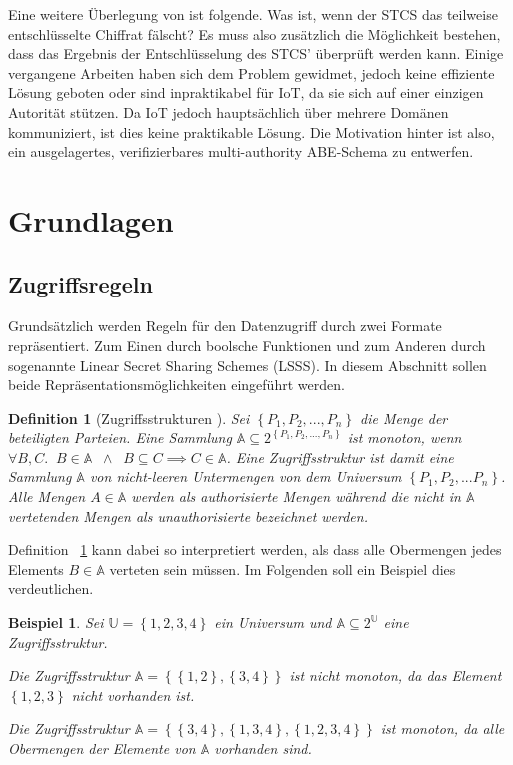 \documentclass{hsflensburg}
\newtheorem{definition}{Definition}
\newtheorem*{example}{Beispiel}
\begin{document}
	Eine weitere Überlegung von \cite{phoabe} ist folgende. Was ist, wenn der STCS
	das teilweise entschlüsselte Chiffrat fälscht? Es muss also zusätzlich die
	Möglichkeit bestehen, dass das Ergebnis der Entschlüsselung des STCS'
	überprüft werden kann. Einige vergangene Arbeiten haben sich dem Problem
	gewidmet, jedoch keine effiziente Lösung geboten oder sind inpraktikabel für
	IoT, da sie sich auf einer einzigen Autorität stützen. Da IoT jedoch
	hauptsächlich über mehrere Domänen kommuniziert, ist dies keine praktikable
	Lösung. Die Motivation hinter \cite{phoabe} ist also, ein ausgelagertes,
	verifizierbares multi-authority ABE-Schema zu entwerfen.
	
	\section{Grundlagen}
	\subsection{Zugriffsregeln}
	Grundsätzlich werden Regeln für den Datenzugriff durch zwei Formate
	repräsentiert. Zum Einen durch boolsche Funktionen und zum Anderen durch
	sogenannte Linear Secret Sharing Schemes (LSSS). In diesem Abschnitt sollen
	beide Repräsentationsmöglichkeiten eingeführt werden.

	\begin{definition}[Zugriffsstrukturen \cite{abe}]\label{def:access-structures}
		Sei $\left\{ P_1, P_2, ..., P_n \right\}$ die Menge der beteiligten
		Parteien. Eine Sammlung $\mathbb{A} \subseteq 2^{\left\{ P_1, P_2, ..., P_n
		\right\}}$ ist monoton, wenn $\forall B, C .\;\; B \in \mathbb{A}
		\;\;\land\;\; B \subseteq C \implies C \in \mathbb{A}$. Eine
		Zugriffsstruktur ist damit eine Sammlung $\mathbb{A}$ von nicht-leeren
		Untermengen von dem Universum $\left\{ P_1, P_2, ... P_n \right\}$. Alle
		Mengen $A \in \mathbb{A}$ werden als authorisierte Mengen während
		die nicht in $\mathbb{A}$ vertetenden Mengen als unauthorisierte
		bezeichnet werden.
	\end{definition}

	Definition ~\ref{def:access-structures} kann dabei so interpretiert werden,
	als dass alle Obermengen jedes Elements $B \in \mathbb{A}$ verteten sein
	müssen. Im Folgenden soll ein Beispiel dies verdeutlichen.

	\begin{example}
		Sei $\mathbb{U} = \left\{ 1, 2, 3, 4 \right\}$ ein Universum und $\mathbb{A}
		\subseteq 2^\mathbb{U}$ eine Zugriffsstruktur.

		Die Zugriffsstruktur $\mathbb{A} = \left\{ \left\{1,2\right\},
		\left\{3,4\right\} \right\}$ ist nicht monoton, da das Element
		$\left\{1,2,3\right\}$ nicht vorhanden ist.

		Die Zugriffsstruktur $\mathbb{A} = \left\{ \left\{3,4\right\},
		\left\{1,3,4\right\}, \left\{1,2,3,4\right\} \right\}$ ist monoton, da alle
		Obermengen der Elemente von $\mathbb{A}$ vorhanden sind.
	\end{example}
\end{document}
